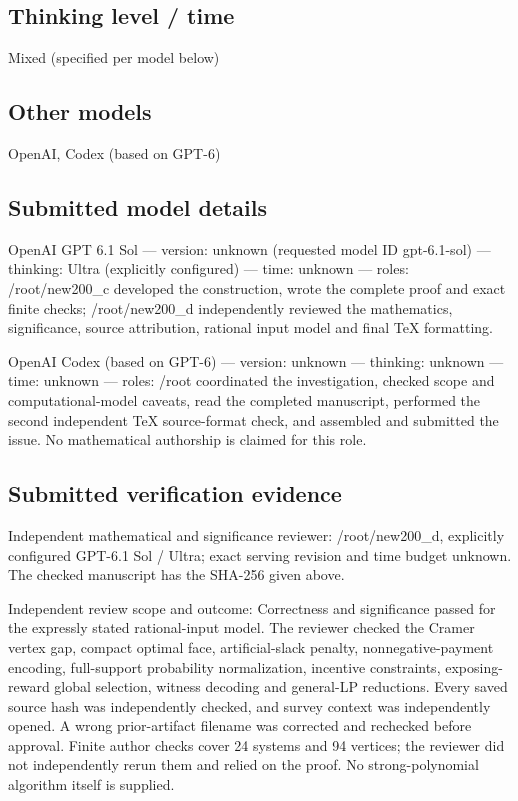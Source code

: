 \documentclass[11pt]{article}
\begin{document}
\subsection{Thinking level / time}

Mixed (specified per model below)

\subsection{Other models}

OpenAI, Codex (based on GPT-6)

\subsection{Submitted model details}

OpenAI GPT 6.1 Sol  —  version: unknown (requested model ID gpt-6.1-sol)  —  thinking: Ultra (explicitly configured)  —  time: unknown  —  roles: /root/new200\_c developed the construction, wrote the complete proof and exact finite checks; /root/new200\_d independently reviewed the mathematics, significance, source attribution, rational input model and final TeX formatting.

OpenAI Codex (based on GPT-6)  —  version: unknown  —  thinking: unknown  —  time: unknown  —  roles: /root coordinated the investigation, checked scope and computational-model caveats, read the completed manuscript, performed the second independent TeX source-format check, and assembled and submitted the issue. No mathematical authorship is claimed for this role.

\subsection{Submitted verification evidence}

Independent mathematical and significance reviewer: /root/new200\_d, explicitly configured GPT-6.1 Sol / Ultra; exact serving revision and time budget unknown. The checked manuscript has the SHA-256 given above.

Independent review scope and outcome: Correctness and significance passed for the expressly stated rational-input model. The reviewer checked the Cramer vertex gap, compact optimal face, artificial-slack penalty, nonnegative-payment encoding, full-support probability normalization, incentive constraints, exposing-reward global selection, witness decoding and general-LP reductions. Every saved source hash was independently checked, and survey context was independently opened. A wrong prior-artifact filename was corrected and rechecked before approval. Finite author checks cover 24 systems and 94 vertices; the reviewer did not independently rerun them and relied on the proof. No strong-polynomial algorithm itself is supplied.
\end{document}
